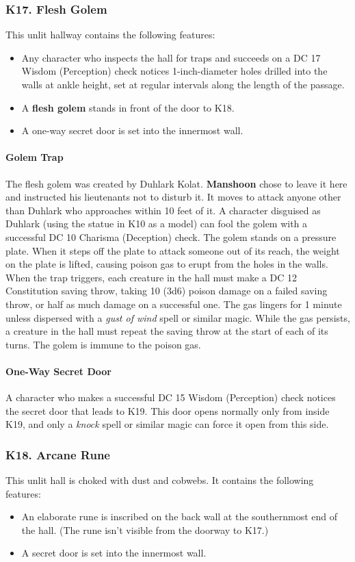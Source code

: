 \documentclass[10pt,a4paper,twoside,twocolumn,openany,nodeprecatedcode]{dndbook}
\begin{document}
\subsubsection{K17. Flesh Golem}
This unlit hallway contains the following features:
\begin{itemize}

\item Any character who inspects the hall for traps and succeeds on a DC 17 Wisdom (Perception) check notices 1-inch-diameter holes drilled into the walls at ankle height, set at regular intervals along the length of the passage.
\item A \textbf{flesh golem} stands in front of the door to K18.
\item A one-way secret door is set into the innermost wall.
\end{itemize}


\paragraph{Golem Trap}
The flesh golem was created by Duhlark Kolat. \textbf{Manshoon} chose to leave it here and instructed his lieutenants not to disturb it. It moves to attack anyone other than Duhlark who approaches within 10 feet of it. A character disguised as Duhlark (using the statue in K10 as a model) can fool the golem with a successful DC 10 Charisma (Deception) check.
The golem stands on a pressure plate. When it steps off the plate to attack someone out of its reach, the weight on the plate is lifted, causing poison gas to erupt from the holes in the walls. When the trap triggers, each creature in the hall must make a DC 12 Constitution saving throw, taking 10 (3d6) poison damage on a failed saving throw, or half as much damage on a successful one. The gas lingers for 1 minute unless dispersed with a \textit{gust of wind} spell or similar magic. While the gas persists, a creature in the hall must repeat the saving throw at the start of each of its turns. The golem is immune to the poison gas.
\paragraph{One-Way Secret Door}
A character who makes a successful DC 15 Wisdom (Perception) check notices the secret door that leads to K19. This door opens normally only from inside K19, and only a \textit{knock} spell or similar magic can force it open from this side.
\subsubsection{K18. Arcane Rune}
This unlit hall is choked with dust and cobwebs. It contains the following features:
\begin{itemize}

\item An elaborate rune is inscribed on the back wall at the southernmost end of the hall. (The rune isn't visible from the doorway to K17.)
\item A secret door is set into the innermost wall.
\end{itemize}
\end{document}
